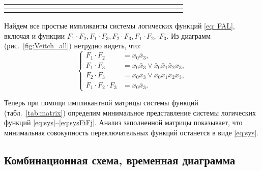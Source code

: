 \begin{landscape}
\begin{table}[]
\begin{tabular}{|c|ccccccccccccccccccccc|}
			\multicolumn{1}{c|}{} &
			\multicolumn{1}{c|}{} &
			\multicolumn{1}{c|}{} &
			\multicolumn{1}{c|}{} &
			\multicolumn{1}{c|}{} &
			\multicolumn{1}{c|}{} &
			\multicolumn{1}{c|}{} &
			\multicolumn{1}{c|}{} &
			\multicolumn{1}{c|}{} &
			\multicolumn{1}{c|}{} &
			\multicolumn{1}{c|}{} &
			\multicolumn{1}{c|}{} &
			\multicolumn{1}{c|}{} &
			\multicolumn{1}{c|}{} &
			\multicolumn{1}{c|}{} &
			\multicolumn{1}{c|}{} &
			\multicolumn{1}{c|}{} &
			\multicolumn{1}{c|}{} &
			\\ \hline
			&
			\multicolumn{1}{c|}{} &
			\multicolumn{1}{c|}{} &
			\multicolumn{1}{c|}{} &
			\multicolumn{1}{c|}{} &
			\multicolumn{1}{c|}{} &
			\multicolumn{1}{c|}{} &
			\multicolumn{1}{c|}{} &
			\multicolumn{1}{c|}{} &
			\multicolumn{1}{c|}{} &
			\multicolumn{1}{c|}{} &
			\multicolumn{1}{c|}{} &
			\multicolumn{1}{c|}{} &
			\multicolumn{1}{c|}{} &
			\multicolumn{1}{c|}{} &
			\multicolumn{1}{c|}{} &
			\multicolumn{1}{c|}{} &
			\multicolumn{1}{c|}{} &
			\multicolumn{1}{c|}{} &
			\multicolumn{1}{c|}{} &
			\multicolumn{1}{c|}{} &
			\\ \hline
		\end{tabular}
	\end{table}
\end{landscape}


Найдем все простые импликанты системы логических функций \eqref{eq: FAL}, включая и функции $F_1\cdot F_2, F_1 \cdot F_3, F_2\cdot F_3, F_1 \cdot F_2, \cdot F_3$. Из диаграмм (рис.~\ref{fig:Veitch_all}) нетрудно видеть, что:
\begin{equation} \label{eq:sysFiFj}
	\left\{
	\begin{aligned}
		F_1\cdot F_2 &= x_0 \bar x_3,\\
		F_1\cdot F_3 &= x_0 \bar x_3 \vee \bar x_0 \bar x_1 \bar x_2 x_3,\\
		F_2\cdot F_3 &= x_0 \bar x_3 \vee x_0 \bar x_1 \bar x_2 x_3,\\
		F_1 \cdot F_2 \cdot F_3 &= x_0 \bar x_3.
	\end{aligned}
	\right.
\end{equation}



Теперь при помощи импликантной матрицы системы функций (табл.~\ref{tab:matrix}) определим минимальное представление системы логических функций \eqref{eq:sys}--\eqref{eq:sysFiFj}. Анализ заполненной матрицы показывает, что минимальная совокупность переключательных функций останется в виде \eqref{eq:sys}.

\subsection{Комбинационная схема, временная диаграмма}

